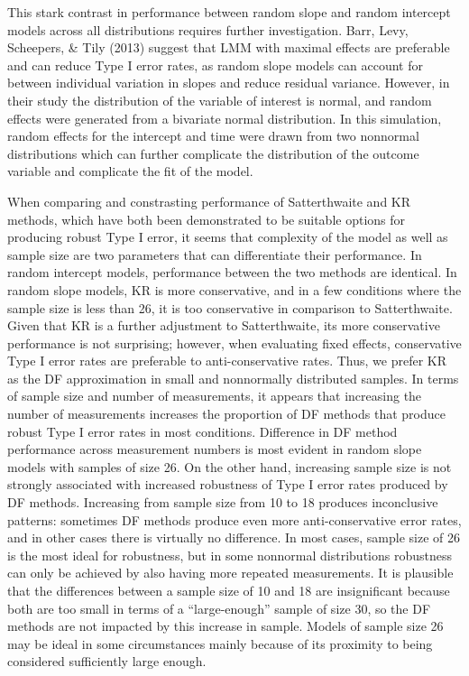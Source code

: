 \documentclass[12pt, twoside]{amherstthesis}
\begin{document}
This stark contrast in performance between random slope and random intercept models across all distributions requires further investigation. Barr, Levy, Scheepers, \& Tily (2013) suggest that LMM with maximal effects are preferable and can reduce Type I error rates, as random slope models can account for between individual variation in slopes and reduce residual variance. However, in their study the distribution of the variable of interest is normal, and random effects were generated from a bivariate normal distribution. In this simulation, random effects for the intercept and time were drawn from two nonnormal distributions which can further complicate the distribution of the outcome variable and complicate the fit of the model.

When comparing and constrasting performance of Satterthwaite and KR methods, which have both been demonstrated to be suitable options for producing robust Type I error, it seems that complexity of the model as well as sample size are two parameters that can differentiate their performance. In random intercept models, performance between the two methods are identical. In random slope models, KR is more conservative, and in a few conditions where the sample size is less than 26, it is too conservative in comparison to Satterthwaite. Given that KR is a further adjustment to Satterthwaite, its more conservative performance is not surprising; however, when evaluating fixed effects, conservative Type I error rates are preferable to anti-conservative rates. Thus, we prefer KR as the DF approximation in small and nonnormally distributed samples.
In terms of sample size and number of measurements, it appears that increasing the number of measurements increases the proportion of DF methods that produce robust Type I error rates in most conditions. Difference in DF method performance across measurement numbers is most evident in random slope models with samples of size 26. On the other hand, increasing sample size is not strongly associated with increased robustness of Type I error rates produced by DF methods. Increasing from sample size from 10 to 18 produces inconclusive patterns: sometimes DF methods produce even more anti-conservative error rates, and in other cases there is virtually no difference. In most cases, sample size of 26 is the most ideal for robustness, but in some nonnormal distributions robustness can only be achieved by also having more repeated measurements. It is plausible that the differences between a sample size of 10 and 18 are insignificant because both are too small in terms of a ``large-enough'' sample of size 30, so the DF methods are not impacted by this increase in sample. Models of sample size 26 may be ideal in some circumstances mainly because of its proximity to being considered sufficiently large enough.
\end{document}
